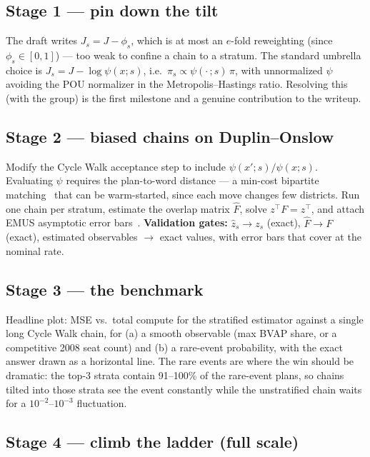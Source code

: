 \documentclass[11pt]{article}
\begin{document}
\subsection*{Stage 1 --- pin down the tilt}

The draft writes $J_s = J - \phi_s$, which is at most an $e$-fold
reweighting (since $\phi_s\in[0,1]$) --- too weak to confine a chain
to a stratum. The standard umbrella choice is
$J_s = J - \log\psi(x;s)$, i.e.\ $\pi_s \propto \psi(\cdot\,;s)\,\pi$,
with unnormalized $\psi$ avoiding the POU normalizer in the
Metropolis--Hastings ratio. Resolving this (with the group) is the
first milestone and a genuine contribution to the writeup.

\subsection*{Stage 2 --- biased chains on Duplin--Onslow}

Modify the Cycle Walk acceptance step to include
$\psi(x';s)/\psi(x;s)$. Evaluating $\psi$ requires the plan-to-word
distance --- a min-cost bipartite matching~\cite{burkard2009} that can
be warm-started, since each move changes few districts. Run one chain
per stratum, estimate the overlap matrix $\hat F$, solve
$z^\top F = z^\top$, and attach EMUS asymptotic error
bars~\cite{thiede2016}. \textbf{Validation gates:} $\hat z_s \to z_s$
(exact), $\hat F \to F$ (exact), estimated observables $\to$ exact
values, with error bars that cover at the nominal rate.

\subsection*{Stage 3 --- the benchmark}

Headline plot: MSE vs.\ total compute for the stratified estimator
against a single long Cycle Walk chain, for (a) a smooth observable
(max BVAP share, or a competitive 2008 seat count) and (b) a
rare-event probability, with the exact answer drawn as a horizontal
line. The rare events are where the win should be dramatic: the top-3
strata contain 91--100\% of the rare-event plans, so chains tilted
into those strata see the event constantly while the unstratified
chain waits for a $10^{-2}$--$10^{-3}$ fluctuation.

\subsection*{Stage 4 --- climb the ladder (full scale)}
\end{document}
